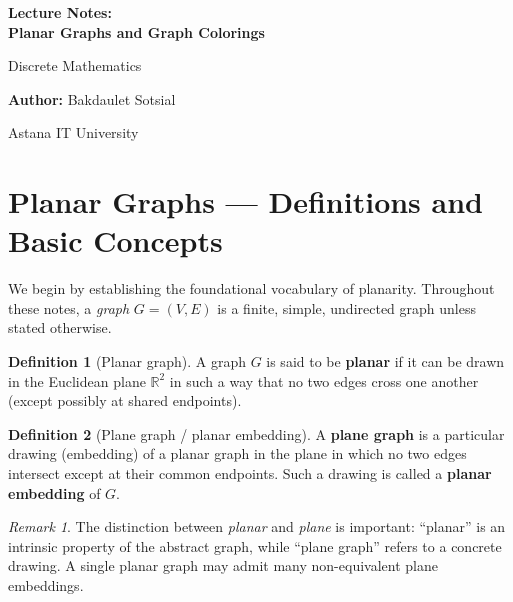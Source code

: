 \documentclass[12pt,a4paper]{article}
\theoremstyle{definition}
\newtheorem{definition}{Definition}[section]
\theoremstyle{plain}
\theoremstyle{remark}
\newtheorem{remark}{Remark}[section]
\begin{document}
\begin{titlepage}
    \centering
    \vspace*{4cm}
    
    {\Huge\bfseries Lecture Notes:\\ Planar Graphs
and Graph Colorings\par}
    \vspace{1cm}
    {\Large Discrete Mathematics\par}
    \vspace{2cm}
    {\large \textbf{Author:} Bakdaulet Sotsial\par}
    \vspace{1cm}
    
    \vfill
    {\small Astana IT University \par}
    \vspace*{2cm}
\end{titlepage}

\thispagestyle{empty}
\tableofcontents
\newpage

\section{Planar Graphs — Definitions and Basic Concepts}
\label{sec:planar-def}

We begin by establishing the foundational vocabulary of planarity.  Throughout
these notes, a \emph{graph} $G=(V,E)$ is a finite, simple, undirected graph
unless stated otherwise.

\begin{definition}[Planar graph]\label{def:planar}
  A graph $G$ is said to be \textbf{planar} if it can be drawn in the Euclidean
  plane $\mathbb{R}^{2}$ in such a way that no two edges cross one another
  (except possibly at shared endpoints).
\end{definition}

\begin{definition}[Plane graph / planar embedding]\label{def:plane}
  A \textbf{plane graph} is a particular drawing (embedding) of a planar graph
  in the plane in which no two edges intersect except at their common endpoints.
  Such a drawing is called a \textbf{planar embedding} of $G$.
\end{definition}

\begin{remark}\label{rem:plane-vs-planar}
  The distinction between \emph{planar} and \emph{plane} is important: ``planar''
  is an intrinsic property of the abstract graph, while ``plane graph'' refers
  to a concrete drawing.  A single planar graph may admit many non-equivalent
  plane embeddings.
\end{remark}
\end{document}
